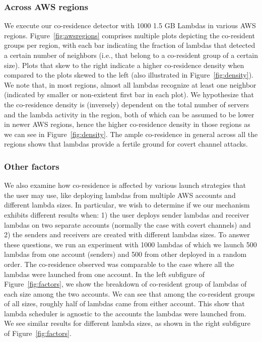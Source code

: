 \subsubsection{Across AWS regions}
We execute our co-residence detector with 1000 1.5 GB Lambdas in various AWS
regions. Figure~\ref{fig:awsregions} comprises multiple plots depicting
the co-resident groups per region, with each bar indicating the fraction of
lambdas that detected a certain number of neighbors (i.e., that belong to a
co-resident group of a certain size). Plots that skew to the right indicate a
higher co-residence density when compared to the plots skewed to the left (also
illustrated in Figure~\ref{fig:density}). We note that, in most regions, almost
all lambdas recognize at least one neighbor (indicated by smaller or
non-existent first bar in each plot). We hypothesize that the co-residence
density is (inversely) dependent on the total number of servers and the lambda
activity in the region, both of which can be assumed to be lower in newer AWS
regions, hence the higher co-residence density in those regions as we can see in
Figure~\ref{fig:density}. The ample co-residence in general across all the
regions shows that lambdas provide a fertile ground for covert channel attacks.


\subsubsection{Other factors}
We also examine how co-residence is affected by various launch strategies that
the user may use, like deploying lambdas from multiple AWS accounts and
different lambda sizes. In particular, we wish to determine if we our mechanism
exhibits different results when: 1) the user deploys sender lambdas and receiver
lambdas on two separate accounts (normally the case with covert channels) and 2)
the senders and receivers are created with different lambdas sizes.  To answer
these questions, we run an experiment with 1000 lambdas of which we launch 500
lambdas from one account (senders) and 500 from other deployed in a random
order. The co-residence observed was comparable to the case where all the
lambdas were launched from one account. In the left subfigure of
Figure~\ref{fig:factors}, we show the breakdown of co-resident group of lambdas
of each size among the two accounts.  We can see that among the co-resident
groups of all sizes, roughly half of lambdas came from either account. This show
that lambda scheduler is agnostic to the accounts the lambdas were launched
from. We see similar results for different lambda sizes, as shown in the right
subfigure of Figure~\ref{fig:factors}.

